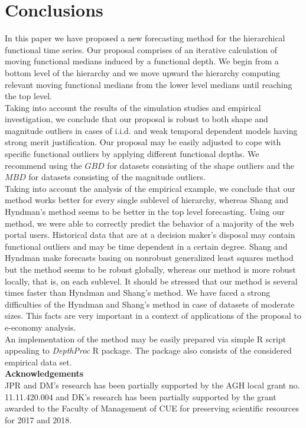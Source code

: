 \documentclass[12pt,a4paper]{article}
\numberwithin{equation}{section}
\begin{document}
\section{Conclusions}
In this paper we have proposed a new forecasting method for the hierarchical functional time series. Our proposal comprises of an iterative calculation of moving functional medians induced by a functional depth. We begin from a bottom level of the hierarchy and we move upward the hierarchy computing relevant moving functional medians from the lower level medians until reaching the top level.\\
Taking into account the results of the simulation studies and empirical investigation, we conclude that our proposal is robust to both shape and magnitude outliers in cases of i.i.d. and weak temporal dependent models having strong merit justification. Our proposal may be easily adjusted to cope with specific functional outliers by applying different functional depths. We recommend using the $GBD$ for datasets consisting of the shape outliers and the $MBD$ for datasets consisting of the magnitude outliers.
\\ Taking into account the analysis of the empirical example, we conclude that our method works better for every single sublevel of hierarchy, whereas Shang and Hyndman's method seems to be better in the top level forecasting. Using our method, we were able to correctly predict the behavior of a majority of the web portal users. Historical data that are at a decision maker's disposal may contain functional outliers and may be time dependent in a certain degree.
Shang and Hyndman \cite{Shang} make forecasts basing on nonrobust generalized least squares method but the method seems to be robust globally, whereas our method is more robust locally, that is, on each sublevel. It should be stressed that our method is several times faster than Hyndman and Shang's method. We have faced a strong difficulties of the Hyndman and Shang's method in case of datasets of moderate sizes. This facts are very important in a context of applications of the proposal to e-economy analysis. 
\\ An implementation of the method may be easily prepared via simple R script appealing to \emph{DepthProc} R package. The package also consists of the considered empirical data set.
\\ \textbf{Acknowledgements}
\\ JPR and DM's research has been partially supported by the AGH local grant no. 11.11.420.004
and DK's research has been partially supported by the grant awarded to the Faculty of Management of CUE for preserving scientific resources for 2017 and 2018.
\end{document}
